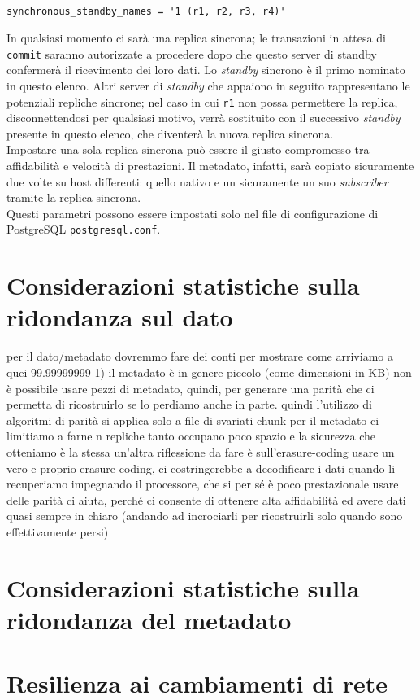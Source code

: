 \begin{verbatim}

synchronous_standby_names = '1 (r1, r2, r3, r4)'

\end{verbatim}

In qualsiasi momento ci sar\`{a} una replica sincrona; le transazioni in attesa di \verb"commit" saranno autorizzate a procedere dopo che questo server di standby confermer\`{a} il ricevimento dei loro dati. 
Lo \textit{standby} sincrono \`{e} il primo nominato in questo elenco. Altri server di \textit{standby} che appaiono in seguito rappresentano le potenziali repliche sincrone; nel caso in cui \verb"r1" non possa permettere la replica, disconnettendosi per qualsiasi motivo, verr\`{a} sostituito con il successivo \textit{standby} presente in questo elenco, che diventer\`{a} la nuova replica sincrona. \\

Impostare una sola replica sincrona pu\`{o} essere il giusto compromesso tra affidabilit\`{a} e velocit\`{a} di prestazioni. Il metadato, infatti, sar\`{a} copiato sicuramente due volte su host differenti: quello nativo e un sicuramente un suo \textit{subscriber} tramite la replica sincrona.\\

Questi parametri possono essere impostati solo nel file di configurazione di PostgreSQL \verb"postgresql.conf".

\section{Considerazioni statistiche sulla ridondanza sul dato}

per il dato/metadato dovremmo fare dei conti per mostrare come arriviamo a quei 99.99999999%
1) il metadato è in genere piccolo (come dimensioni in KB)
non è possibile usare pezzi di metadato, quindi, per generare una parità che ci permetta di ricostruirlo se lo perdiamo anche in parte.
quindi l'utilizzo di algoritmi di parità si applica solo a file di svariati chunk
per il metadato ci limitiamo a farne n repliche 
tanto occupano poco spazio e la sicurezza che otteniamo è la stessa
un'altra riflessione da fare è sull'erasure-coding
usare un vero e proprio erasure-coding, ci costringerebbe a decodificare i dati quando li recuperiamo
impegnando il processore, che si per sé è poco prestazionale
usare delle parità ci aiuta, perché ci consente di ottenere alta affidabilità
ed avere dati quasi sempre in chiaro (andando ad incrociarli per ricostruirli solo quando sono effettivamente persi)

\section{Considerazioni statistiche sulla ridondanza del metadato}
\section{Resilienza ai cambiamenti di rete}

